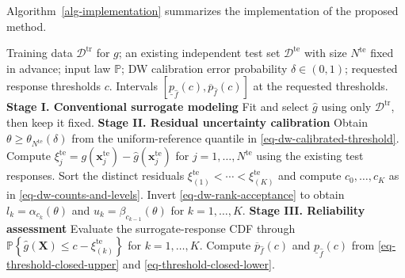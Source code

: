 \documentclass[review,11pt,3p,authoryear,nopreprintline]{elsarticle}
\begin{document}
Algorithm~\ref{alg-implementation} summarizes the implementation of the proposed method.

\begin{algorithm}[H]
  \caption{Residual calibration and reliability assessment within a surrogate workflow}
  \label{alg-implementation}
  \small
  \begin{algorithmic}[1]
    \Require Training data $\mathcal D^{\mathrm{tr}}$ for $g$; an existing independent test set $\mathcal D^{\mathrm{te}}$ with size $N^{\mathrm{te}}$ fixed in advance; input law $\mathbb P$; DW calibration error probability $\delta\in(0,1)$; requested response thresholds $c$.
    \Ensure Intervals $\left[\underline p_{\hat f}(c),\overline p_{\hat f}(c)\right]$ at the requested thresholds.
    \Statex \textbf{Stage I. Conventional surrogate modeling}
    \State Fit and select $\hat g$ using only $\mathcal D^{\mathrm{tr}}$, then keep it fixed.
    \Statex \textbf{Stage II. Residual uncertainty calibration}
    \State Obtain $\theta\ge\theta_{N^{\mathrm{te}}}(\delta)$ from the uniform-reference quantile in \eqref{eq-dw-calibrated-threshold}.
    \State Compute $\xi_j^{\mathrm{te}}=g(\bm x_j^{\mathrm{te}})-\hat g(\bm x_j^{\mathrm{te}})$ for $j=1,\ldots,N^{\mathrm{te}}$ using the existing test responses.
    \State Sort the distinct residuals $\xi_{(1)}^{\mathrm{te}}<\cdots<\xi_{(K)}^{\mathrm{te}}$ and compute $c_0,\ldots,c_K$ as in \eqref{eq-dw-counts-and-levels}.
    \State Invert \eqref{eq-dw-rank-acceptance} to obtain $l_k=\alpha_{c_k}(\theta)$ and $u_k=\beta_{c_{k-1}}(\theta)$ for $k=1,\ldots,K$.
    \Statex \textbf{Stage III. Reliability assessment}
      \State Evaluate the surrogate-response CDF through $\mathbb P\left\{\hat g(\bm X)\le c-\xi_{(k)}^{\mathrm{te}}\right\}$ for $k=1,\ldots,K$.
      \State Compute $\overline p_{\hat f}(c)$ and $\underline p_{\hat f}(c)$ from \eqref{eq-threshold-closed-upper} and \eqref{eq-threshold-closed-lower}.
    \EndFor
  \end{algorithmic}
\end{algorithm}
\end{document}
